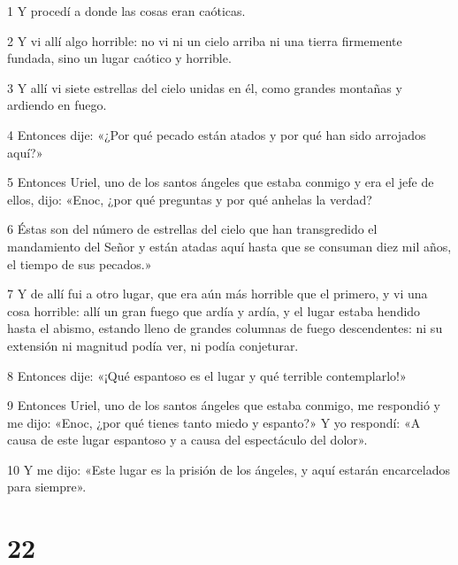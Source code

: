 \par 1 Y procedí a donde las cosas eran caóticas.
\par 2 Y vi allí algo horrible: no vi ni un cielo arriba ni una tierra firmemente fundada, sino un lugar caótico y horrible.
\par 3 Y allí vi siete estrellas del cielo unidas en él, como grandes montañas y ardiendo en fuego.
\par 4 Entonces dije: «¿Por qué pecado están atados y por qué han sido arrojados aquí?»
\par 5 Entonces Uriel, uno de los santos ángeles que estaba conmigo y era el jefe de ellos, dijo: «Enoc, ¿por qué preguntas y por qué anhelas la verdad?
\par 6 Éstas son del número de estrellas del cielo que han transgredido el mandamiento del Señor y están atadas aquí hasta que se consuman diez mil años, el tiempo de sus pecados.»
\par 7 Y de allí fui a otro lugar, que era aún más horrible que el primero, y vi una cosa horrible: allí un gran fuego que ardía y ardía, y el lugar estaba hendido hasta el abismo, estando lleno de grandes columnas de fuego descendentes: ni su extensión ni magnitud podía ver, ni podía conjeturar.
\par 8 Entonces dije: «¡Qué espantoso es el lugar y qué terrible contemplarlo!»
\par 9 Entonces Uriel, uno de los santos ángeles que estaba conmigo, me respondió y me dijo: «Enoc, ¿por qué tienes tanto miedo y espanto?» Y yo respondí: «A causa de este lugar espantoso y a causa del espectáculo del dolor».
\par 10 Y me dijo: «Este lugar es la prisión de los ángeles, y aquí estarán encarcelados para siempre».

\chapter{22}

